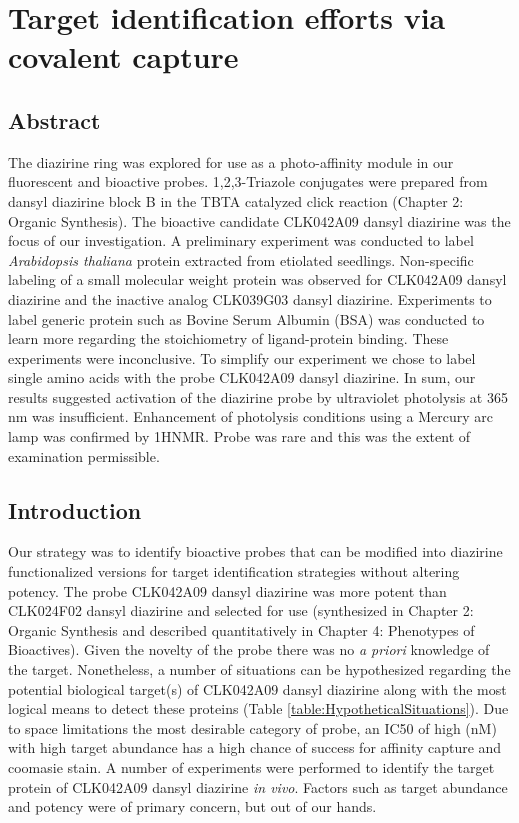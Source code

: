 \chapter{Target identification efforts via covalent capture}

\section{Abstract}

The diazirine ring was explored for use as a photo-affinity module in our fluorescent and bioactive probes. 1,2,3-Triazole conjugates were prepared from dansyl diazirine block B in the TBTA catalyzed click reaction (Chapter 2: Organic Synthesis). The bioactive candidate CLK042A09 dansyl diazirine was the focus of our investigation. A preliminary experiment was conducted to label {\it Arabidopsis thaliana} protein extracted from etiolated seedlings.  Non-specific labeling of a small molecular weight protein was observed for CLK042A09 dansyl diazirine and the inactive analog CLK039G03 dansyl diazirine. Experiments to label generic protein such as Bovine Serum Albumin (BSA) was conducted to learn more regarding the stoichiometry of ligand-protein binding. These experiments were inconclusive. To simplify our experiment we chose to label single amino acids with the probe CLK042A09 dansyl diazirine. In sum, our results suggested activation of the diazirine probe by ultraviolet photolysis at 365 nm was insufficient. Enhancement of photolysis conditions using a Mercury arc lamp was confirmed by 1HNMR. Probe was rare and this was the extent of examination permissible.

\section{Introduction}

Our strategy was to identify bioactive probes that can be modified into diazirine functionalized versions for target identification strategies without altering potency. The probe CLK042A09 dansyl diazirine was more potent than CLK024F02 dansyl diazirine and selected for use (synthesized in Chapter 2: Organic Synthesis and described quantitatively in Chapter 4: Phenotypes of Bioactives). Given the novelty of the probe there was no {\it a priori} knowledge of the target. Nonetheless, a number of situations can be hypothesized regarding the potential biological target(s) of CLK042A09 dansyl diazirine along with the most logical means to detect these proteins (Table \ref{table:HypotheticalSituations}). Due to space limitations the most desirable category of probe, an IC50 of high (nM) with high target abundance has a high chance of success for affinity capture and coomasie stain. A number of experiments were performed to identify the target protein of CLK042A09 dansyl diazirine {\it in vivo}. Factors such as target abundance and potency were of primary concern, but out of our hands. 

